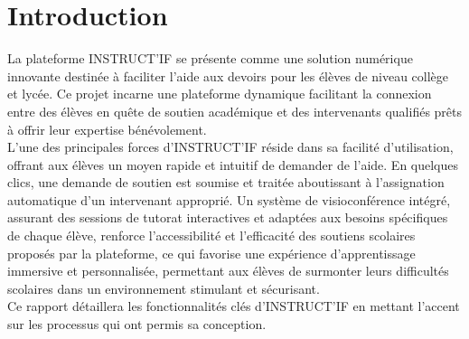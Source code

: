 \section*{Introduction}
La plateforme INSTRUCT’IF se présente comme une solution numérique innovante destinée à faciliter l'aide aux devoirs pour les élèves de niveau collège et lycée. Ce projet incarne une plateforme dynamique facilitant la connexion entre des élèves en quête de soutien académique et des intervenants qualifiés prêts à offrir leur expertise bénévolement.
\newline
\\
L'une des principales forces d’INSTRUCT’IF réside dans sa facilité d'utilisation, offrant aux élèves un moyen rapide et intuitif de demander de l'aide. En quelques clics, une demande de soutien est soumise et traitée aboutissant à l'assignation automatique d'un intervenant approprié. Un système de visioconférence intégré, assurant des sessions de tutorat interactives et adaptées aux besoins spécifiques de chaque élève, renforce l'accessibilité et l'efficacité des soutiens scolaires proposés par la plateforme, ce qui favorise une expérience d'apprentissage immersive et personnalisée, permettant aux élèves de surmonter leurs difficultés scolaires dans un environnement stimulant et sécurisant. \newline
\\
Ce rapport détaillera les fonctionnalités clés d’INSTRUCT’IF en mettant l’accent sur les processus qui ont permis sa conception.

